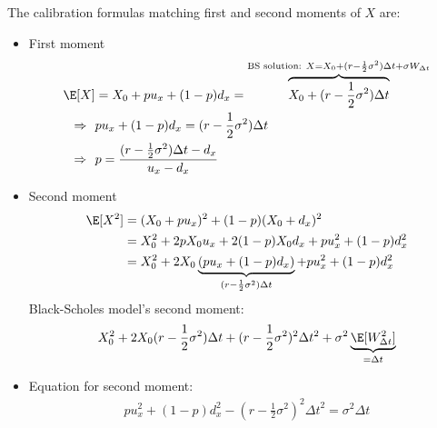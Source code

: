 \begin{frame}
\begin{center}
\end{center}

The calibration formulas matching first and second moments of $X$ are:
\begin{itemize}
\item First moment
\begin{align}
\E[X] & = X_0 + p u_x + (1-p) d_x = \overbrace{X_0 + (r-\frac12 \sigma^2)\Delta t}^{\text{BS solution: } X = X_0 + (r - \frac12\sigma^2) \Delta t + \sigma W_{\Delta t}} \\
\Rightarrow ~~ & p u_x + (1-p) d_x = (r - \frac12 \sigma^2) \Delta t \\
\Rightarrow ~~ & p = \frac{(r - \frac12 \sigma^2) \Delta t - d_x}{u_x - d_x}
\label{eq:x_firstMoment}
\end{align}
\end{itemize}
\end{frame}

\begin{frame}
\begin{itemize}
\item Second moment
\begin{align}
\E[X^2] & = (X_0 + p u_x)^2 + (1-p) (X_0 + d_x)^2 \\
 & = X_0^2 + 2pX_0 u_x + 2(1-p)X_0d_x + pu_x^2 + (1-p)d_x^2 \\
 & = X_0^2 + 2X_0 \underbrace{(pu_x + (1-p)d_x)}_{(r-\frac12\sigma^2)\Delta t} + pu_x^2 + (1-p) d_x^2
\end{align}
Black-Scholes model's second moment:
\begin{align}
X_0^2 + 2X_0(r-\frac12 \sigma^2)\Delta t + (r-\frac12 \sigma^2)^2\Delta t^2 + \sigma^2 \underbrace{\E[W_{\Delta t}^2]}_{= \Delta t}
\end{align}
\item Equation for second moment:
\begin{align}
\label{eq:x_secondMoment}
pu_x^2 + (1-p)d_x^2 - (r-\frac12\sigma^2)^2 {\Delta t}^2 = \sigma^2 \Delta t
\end{align}
\end{itemize}
\end{frame}

